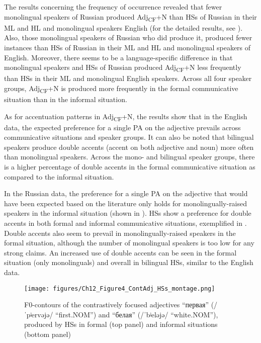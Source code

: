 \documentclass[output=paper,colorlinks,citecolor=brown]{langscibook}
\begin{document}
The results concerning the frequency of occurrence revealed that fewer monolingual speakers of Russian produced Adj\textsubscript{CF}+N than HSs of Russian in their ML and HL and monolingual speakers English (for the detailed results, see \cite{Zerbian_Böttcher_Zuban_2022}). Also, those monolingual speakers of Russian who did produce it, produced fewer instances than HSs of Russian in their ML and HL and monolingual speakers of English. Moreover, there seems to be a language-specific difference in that monolingual speakers and HSs of Russian produced Adj\textsubscript{CF}+N less frequently than HSs in their ML and monolingual English speakers. Across all four speaker groups, Adj\textsubscript{CF}+N is produced more frequently in the formal communicative situation than in the informal situation.

As for accentuation patterns in Adj\textsubscript{CF}+N, the results show that in the English data, the expected preference for a single PA on the adjective prevails across communicative situations and speaker groups. It can also be noted that bilingual speakers produce double accents (accent on both adjective and noun) more often than monolingual speakers. Across the mono- and bilingual speaker groups, there is a higher percentage of double accents in the formal communicative situation as compared to the informal situation.

In the Russian data, the preference for a single PA on the adjective that would have been expected based on the literature only holds for monolingually-raised speakers in the informal situation (shown in ). HSs show a preference for double accents in both formal and informal communicative situations, exemplified in . Double accents also seem to prevail in monolingually-raised speakers in the formal situation, although the number of monolingual speakers is too low for any strong claims. An increased use of double accents can be seen in the formal situation (only monolinguals) and overall in bilingual HSs, similar to the English data.

\begin{figure}
  \centering
  \texttt{[image: figures/Ch12\_Figure4\_ContAdj\_HSs\_montage.png]}
  \caption{F0-contours of the contrastively focused adjectives “первая” (/ˈpʲervəjə/ “first.NOM”) and “белая” (/ˈbʲeləjə/ “white.NOM”), produced by HSs in formal (top panel) and informal situations (bottom panel)}
  \label{chapter12:fig:4}
\end{figure}
\end{document}
